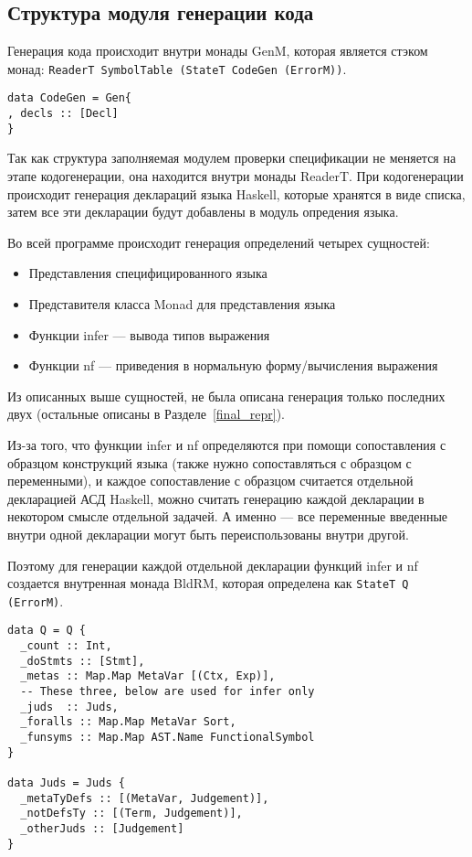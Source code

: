 \subsection{Структура модуля генерации кода}\label{repr}
Генерация кода происходит внутри монады GenM, которая является стэком монад: \lstinline{ReaderT SymbolTable (StateT CodeGen (ErrorM))}.

\begin{lstlisting}[caption={Структура используемая при кодогенерации},captionpos=b,frame=single]
data CodeGen = Gen{
, decls :: [Decl]
}
\end{lstlisting}

Так как структура заполняемая модулем проверки спецификации не меняется на этапе кодогенерации, она находится внутри монады ReaderT. При кодогенерации происходит генерация деклараций языка Haskell, которые хранятся в виде списка, затем все эти декларации будут добавлены в модуль опредения языка.

Во всей программе происходит генерация определений четырех сущностей:
\begin{itemize}
\item Представления специфицированного языка
\item Представителя класса Monad для представления языка
\item Функции infer --- вывода типов выражения
\item Функции nf --- приведения в нормальную форму/вычисления выражения
\end{itemize}

Из описанных выше сущностей, не была описана генерация только последних двух (остальные описаны в Разделе~\ref{final_repr}).

Из-за того, что функции infer и nf определяются при помощи сопоставления с образцом конструкций языка (также нужно сопоставляться с образцом с переменными), и каждое сопоставление с образцом считается отдельной декларацией АСД Haskell, можно считать генерацию каждой декларации в некотором смысле отдельной задачей. А именно --- все переменные введенные внутри одной декларации могут быть переиспользованы внутри другой.

Поэтому для генерации каждой отдельной декларации функций infer и nf создается внутренная монада BldRM, которая определена как \lstinline{StateT Q (ErrorM)}.

\begin{lstlisting}[caption={Структура используемая при кодогенерации функций infer и nf},captionpos=b,frame=single]
data Q = Q {
  _count :: Int,
  _doStmts :: [Stmt],
  _metas :: Map.Map MetaVar [(Ctx, Exp)],
  -- These three, below are used for infer only
  _juds  :: Juds,
  _foralls :: Map.Map MetaVar Sort,
  _funsyms :: Map.Map AST.Name FunctionalSymbol
}

data Juds = Juds {
  _metaTyDefs :: [(MetaVar, Judgement)],
  _notDefsTy :: [(Term, Judgement)],
  _otherJuds :: [Judgement]
}
\end{lstlisting}

